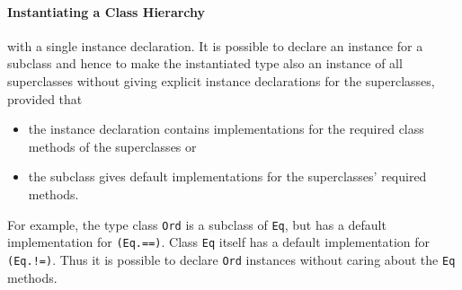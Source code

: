 %
%
%

\paragraph{Instantiating a Class Hierarchy} with a single instance declaration. It is possible to declare an instance for a subclass and hence to make the instantiated type also an instance of all superclasses without giving explicit instance declarations for the superclasses, provided that
\begin{itemize}
\item the instance declaration contains implementations for the required class methods of the superclasses or
\item the subclass gives default implementations for the superclasses' required methods.
\end{itemize}
For example, the type class \texttt{Ord} is a subclass of \texttt{Eq}, but has a default implementation for \texttt{(Eq.==)}.
Class \texttt{Eq} itself has a default implementation for \texttt{(Eq.!=)}.
Thus it is possible to declare  \texttt{Ord} instances without caring about the \texttt{Eq} methods.


